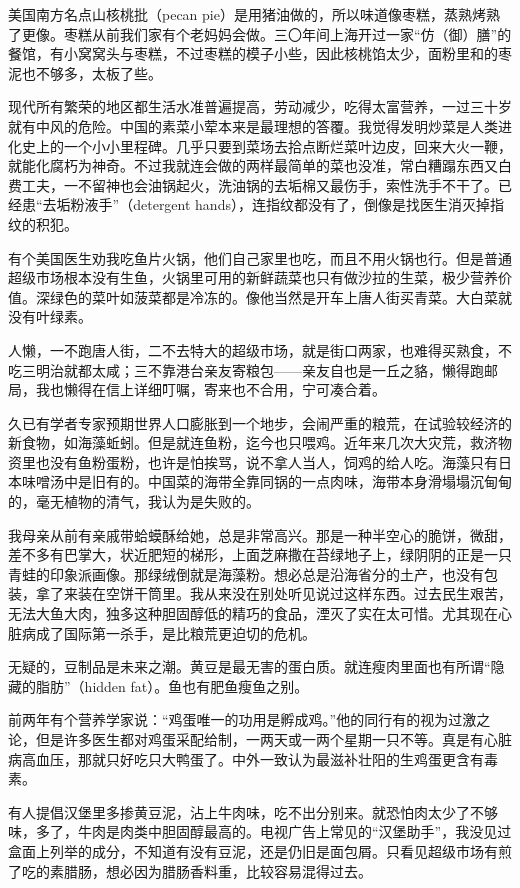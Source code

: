 \par 美国南方名点山核桃批（pecan pie）是用猪油做的，所以味道像枣糕，蒸熟烤熟了更像。枣糕从前我们家有个老妈妈会做。三〇年间上海开过一家“仿（御）膳”的餐馆，有小窝窝头与枣糕，不过枣糕的模子小些，因此核桃馅太少，面粉里和的枣泥也不够多，太板了些。
\par 现代所有繁荣的地区都生活水准普遍提高，劳动减少，吃得太富营养，一过三十岁就有中风的危险。中国的素菜小荤本来是最理想的答覆。我觉得发明炒菜是人类进化史上的一个小小里程碑。几乎只要到菜场去拾点断烂菜叶边皮，回来大火一鞭，就能化腐朽为神奇。不过我就连会做的两样最简单的菜也没准，常白糟蹋东西又白费工夫，一不留神也会油锅起火，洗油锅的去垢棉又最伤手，索性洗手不干了。已经患“去垢粉液手”（detergent hands），连指纹都没有了，倒像是找医生消灭掉指纹的积犯。
\par 有个美国医生劝我吃鱼片火锅，他们自己家里也吃，而且不用火锅也行。但是普通超级市场根本没有生鱼，火锅里可用的新鲜蔬菜也只有做沙拉的生菜，极少营养价值。深绿色的菜叶如菠菜都是冷冻的。像他当然是开车上唐人街买青菜。大白菜就没有叶绿素。
\par 人懒，一不跑唐人街，二不去特大的超级市场，就是街口两家，也难得买熟食，不吃三明治就都太咸；三不靠港台亲友寄粮包——亲友自也是一丘之貉，懒得跑邮局，我也懒得在信上详细叮嘱，寄来也不合用，宁可凑合着。
\par 久已有学者专家预期世界人口膨胀到一个地步，会闹严重的粮荒，在试验较经济的新食物，如海藻蚯蚓。但是就连鱼粉，迄今也只喂鸡。近年来几次大灾荒，救济物资里也没有鱼粉蛋粉，也许是怕挨骂，说不拿人当人，饲鸡的给人吃。海藻只有日本味噌汤中是旧有的。中国菜的海带全靠同锅的一点肉味，海带本身滑塌塌沉甸甸的，毫无植物的清气，我认为是失败的。
\par 我母亲从前有亲戚带蛤蟆酥给她，总是非常高兴。那是一种半空心的脆饼，微甜，差不多有巴掌大，状近肥短的梯形，上面芝麻撒在苔绿地子上，绿阴阴的正是一只青蛙的印象派画像。那绿绒倒就是海藻粉。想必总是沿海省分的土产，也没有包装，拿了来装在空饼干筒里。我从来没在别处听见说过这样东西。过去民生艰苦，无法大鱼大肉，独多这种胆固醇低的精巧的食品，湮灭了实在太可惜。尤其现在心脏病成了国际第一杀手，是比粮荒更迫切的危机。
\par 无疑的，豆制品是未来之潮。黄豆是最无害的蛋白质。就连瘦肉里面也有所谓“隐藏的脂肪”（hidden fat）。鱼也有肥鱼瘦鱼之别。
\par 前两年有个营养学家说：“鸡蛋唯一的功用是孵成鸡。”他的同行有的视为过激之论，但是许多医生都对鸡蛋采配给制，一两天或一两个星期一只不等。真是有心脏病高血压，那就只好吃只大鸭蛋了。中外一致认为最滋补壮阳的生鸡蛋更含有毒素。
\par 有人提倡汉堡里多掺黄豆泥，沾上牛肉味，吃不出分别来。就恐怕肉太少了不够味，多了，牛肉是肉类中胆固醇最高的。电视广告上常见的“汉堡助手”，我没见过盒面上列举的成分，不知道有没有豆泥，还是仍旧是面包屑。只看见超级市场有煎了吃的素腊肠，想必因为腊肠香料重，比较容易混得过去。
